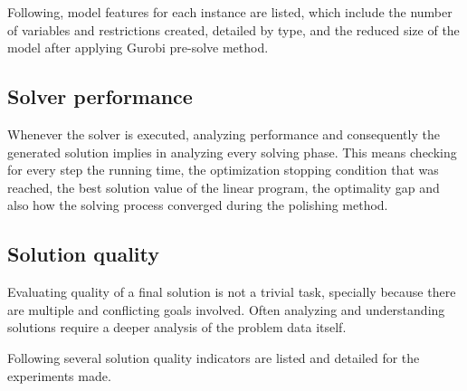 Following, model features for each instance are listed, which include the number of variables and restrictions created, detailed by type, and the reduced size of the model after applying Gurobi pre-solve method.


\subsection{Solver performance}

Whenever the solver is executed, analyzing performance and consequently the generated solution implies in analyzing every solving phase. This means checking for every step the running time, the optimization stopping condition that was reached, the best solution value of the linear program, the optimality gap and also how the solving process converged during the polishing method.


\subsection{Solution quality}

Evaluating quality of a final solution is not a trivial task, specially because there are multiple and conflicting goals involved. Often analyzing and understanding solutions require a deeper analysis of the problem data itself.

Following several solution quality indicators are listed and detailed for the experiments made.


